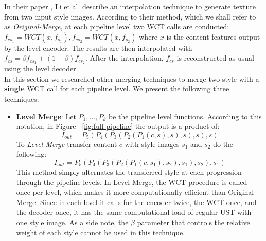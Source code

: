 In their paper \cite{bib11}, Li et al. describe an interpolation technique to generate texture from two input style images. According to their method, which we shall refer to as \textit{Original-Merge}, at each pipeline level two WCT calls are conducted: $f_{cs_1} = WCT(x, f_{s_1}), f_{cs_2} = WCT(x, f_{s_2})$ where $x$ is the content features output by the level encoder. The results are then interpolated with $f_{cs} = \beta f_{cs_1} + (1-\beta)f_{cs_2}$. After the interpolation, $f_{cs}$ is reconstructed as usual using the level decoder.\\

In this section we researched other merging techniques to merge two style with a \textbf{single} WCT call for each pipeline level. We present the following three techniques:

\begin{itemize}
	\item \textbf{Level Merge}: Let $P_1, \dots, P_k$ be the pipeline level functions. According to this notation, in Figure ~\ref{fig:full-pipeline} the output is a product of:
	\begin{equation*}
	I_{out} = P_5 ( P_4 ( P_3 ( P_2 ( P_1 (c,s),s) ,s),s), s)
	\end{equation*}
	To \textit{Level Merge} transfer content $c$ with style images $s_1$ and $s_2$ do the following:
	\begin{equation*}
	I_{out} = P_5 ( P_4 ( P_3 ( P_2 ( P_1 (c, s_1), s_2), s_1), s_2), s_1)
	\end{equation*}
	This method simply alternates the transferred style at each progression through the pipeline levels. In Level-Merge, the WCT procedure is called once per level, which makes it more computationally efficient than Original-Merge. Since in each level it calls for the encoder twice, the WCT once, and the decoder once, it has the same computational load of regular UST with one style image. As a side note, the $\beta$ parameter that controls the relative weight of each style cannot be used in this technique.
	 

\end{itemize}
